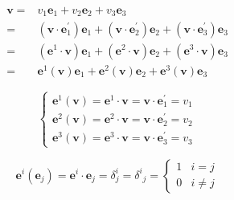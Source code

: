 \documentclass[
]{book}
\theoremstyle{definition}
\theoremstyle{definition}
\theoremstyle{definition}
\theoremstyle{definition}
\theoremstyle{remark}
\begin{document}
\[
\begin{aligned}
\boldsymbol{v}= & v_{{\scriptscriptstyle 1}}\boldsymbol{e}_{{\scriptscriptstyle 1}}+v_{{\scriptscriptstyle 2}}\boldsymbol{e}_{{\scriptscriptstyle 2}}+v_{{\scriptscriptstyle 3}}\boldsymbol{e}_{{\scriptscriptstyle 3}}\\
= & \left(\boldsymbol{v}\cdot\boldsymbol{e}_{{\scriptscriptstyle 1}}^{\prime}\right)\boldsymbol{e}_{{\scriptscriptstyle 1}}+\left(\boldsymbol{v}\cdot\boldsymbol{e}_{{\scriptscriptstyle 2}}^{\prime}\right)\boldsymbol{e}_{{\scriptscriptstyle 2}}+\left(\boldsymbol{v}\cdot\boldsymbol{e}_{{\scriptscriptstyle 3}}^{\prime}\right)\boldsymbol{e}_{{\scriptscriptstyle 3}}\\
= & \left(\boldsymbol{e}^{{\scriptscriptstyle 1}}\cdot\boldsymbol{v}\right)\boldsymbol{e}_{{\scriptscriptstyle 1}}+\left(\boldsymbol{e}^{{\scriptscriptstyle 2}}\cdot\boldsymbol{v}\right)\boldsymbol{e}_{{\scriptscriptstyle 2}}+\left(\boldsymbol{e}^{{\scriptscriptstyle 3}}\cdot\boldsymbol{v}\right)\boldsymbol{e}_{{\scriptscriptstyle 3}}\\
= & \boldsymbol{e}^{{\scriptscriptstyle 1}}\left(\boldsymbol{v}\right)\boldsymbol{e}_{{\scriptscriptstyle 1}}+\boldsymbol{e}^{{\scriptscriptstyle 2}}\left(\boldsymbol{v}\right)\boldsymbol{e}_{{\scriptscriptstyle 2}}+\boldsymbol{e}^{{\scriptscriptstyle 3}}\left(\boldsymbol{v}\right)\boldsymbol{e}_{{\scriptscriptstyle 3}}
\end{aligned}
\]

\[
\begin{cases}
\boldsymbol{e}^{{\scriptscriptstyle 1}}\left(\boldsymbol{v}\right)=\boldsymbol{e}^{{\scriptscriptstyle 1}}\cdot\boldsymbol{v}=\boldsymbol{v}\cdot\boldsymbol{e}_{{\scriptscriptstyle 1}}^{\prime}=v_{{\scriptscriptstyle 1}}\\
\boldsymbol{e}^{{\scriptscriptstyle 2}}\left(\boldsymbol{v}\right)=\boldsymbol{e}^{{\scriptscriptstyle 2}}\cdot\boldsymbol{v}=\boldsymbol{v}\cdot\boldsymbol{e}_{{\scriptscriptstyle 2}}^{\prime}=v_{{\scriptscriptstyle 2}}\\
\boldsymbol{e}^{{\scriptscriptstyle 3}}\left(\boldsymbol{v}\right)=\boldsymbol{e}^{{\scriptscriptstyle 3}}\cdot\boldsymbol{v}=\boldsymbol{v}\cdot\boldsymbol{e}_{{\scriptscriptstyle 3}}^{\prime}=v_{{\scriptscriptstyle 3}}
\end{cases}
\]

\[
\boldsymbol{e}^{{\scriptscriptstyle i}}\left(\boldsymbol{e}_{{\scriptscriptstyle j}}\right)=\boldsymbol{e}^{{\scriptscriptstyle i}}\cdot\boldsymbol{e}_{{\scriptscriptstyle j}}=\delta_{{\scriptscriptstyle j}}^{{\scriptscriptstyle i}}=\delta^{{\scriptscriptstyle i}}{}_{{\scriptscriptstyle j}}=\begin{cases}
1 & i=j\\
0 & i\ne j
\end{cases}
\]
\end{document}
